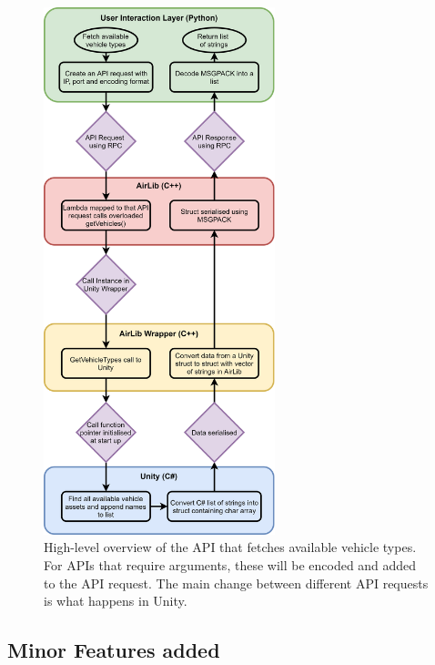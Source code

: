\begin{figure}[h]
    \centering
    \includegraphics[width=0.6\textwidth]{06_Implementation/00_AirSim/Diagrams/stringArray.png}
    \caption{High-level overview of the API that fetches available vehicle types. For APIs that require arguments, these will be encoded and added to the API request. The main change between different API requests is what happens in Unity.} \label{06:stringList}
\end{figure}

\subsection{Minor Features added}
